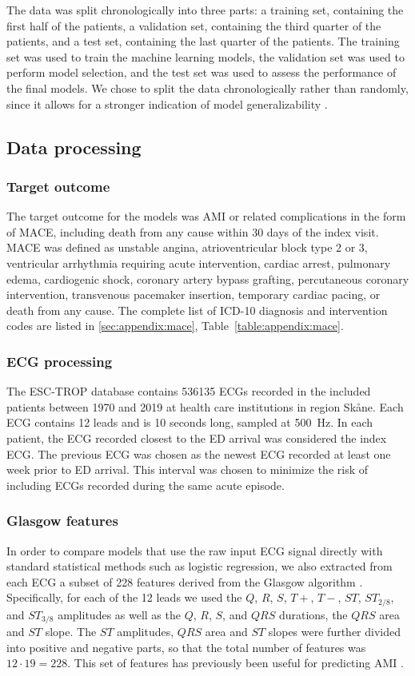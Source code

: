 \documentclass[preprint]{elsarticle}
\begin{document}
The data was split chronologically into three parts: a training set, containing the first half of the patients, a validation set, containing the third quarter of the patients, and a test set, containing the last quarter of the patients. The training set was used to train the machine learning models, the validation set was used to perform model selection, and the test set was used to assess the performance of the final models. We chose to split the data chronologically rather than randomly, since it allows for a stronger indication of model generalizability \citep{steyerberg2009}.


\subsection{Data processing}
\subsubsection{Target outcome}
The target outcome for the models was AMI or related complications in the form of MACE, including death from any cause within 30 days of the index visit. MACE was defined as unstable angina, atrioventricular block type 2 or 3, ventricular arrhythmia requiring acute intervention, cardiac arrest, pulmonary edema, cardiogenic shock, coronary artery bypass grafting, percutaneous coronary intervention, transvenous pacemaker insertion, temporary cardiac pacing, or death from any cause. The complete list of ICD-10 diagnosis and intervention codes are listed in \ref{sec:appendix:mace}, Table~\ref{table:appendix:mace}.

\subsubsection{ECG processing}
The ESC-TROP database contains 536135 ECGs recorded in the included patients between 1970 and 2019 at health care institutions in region Sk\aa{}ne. Each ECG contains 12 leads and is 10 seconds long, sampled at \SI{500}{\hertz}. In each patient, the ECG recorded closest to the ED arrival was considered the index ECG. The previous ECG was chosen as the newest ECG recorded at least one week prior to ED arrival. This interval was chosen to minimize the risk of including ECGs recorded during the same acute episode.

\subsubsection{Glasgow features}
\label{sec:glasgow}
In order to compare models that use the raw input ECG signal directly with standard statistical methods such as logistic regression, we also extracted from each ECG a subset of 228 features derived from the Glasgow algorithm \citep{macfarlane2005}. Specifically, for each of the 12 leads we used the $Q$, $R$, $S$, $T+$, $T-$, $ST$, $ST_{2/8}$, and $ST_{3/8}$ amplitudes as well as the $Q$, $R$, $S$, and $QRS$ durations, the $QRS$ area and $ST$ slope. The $ST$ amplitudes, $QRS$ area and $ST$ slopes were further divided into positive and negative parts, so that the total number of features was $12 \cdot 19=228$. This set of features has previously been useful for predicting AMI \citep{forberg2009}.
\end{document}
